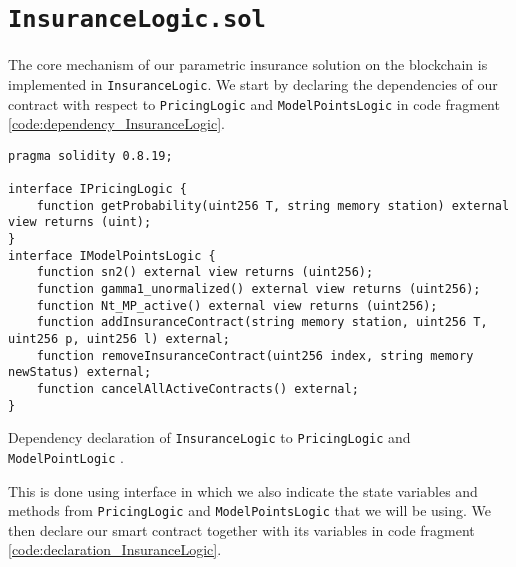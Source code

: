 \documentclass[10pt]{article}
\begin{document}
\section{\texttt{InsuranceLogic.sol}}\label{sec:InsuranceLogic_sol}
The core mechanism of our parametric insurance solution on the blockchain is implemented in \texttt{InsuranceLogic}. We start by declaring the dependencies of our contract with respect to \texttt{PricingLogic} and \texttt{ModelPointsLogic} in code fragment \ref{code:dependency_InsuranceLogic}.

\begin{codefragment}[!h]
\begin{lstlisting}[language=Solidity]
pragma solidity 0.8.19;

interface IPricingLogic {
    function getProbability(uint256 T, string memory station) external view returns (uint);
}
interface IModelPointsLogic {
    function sn2() external view returns (uint256);
    function gamma1_unormalized() external view returns (uint256);
    function Nt_MP_active() external view returns (uint256);
    function addInsuranceContract(string memory station, uint256 T, uint256 p, uint256 l) external;
    function removeInsuranceContract(uint256 index, string memory newStatus) external;
    function cancelAllActiveContracts() external;
}
\end{lstlisting}
    \caption{Dependency declaration of \texttt{InsuranceLogic} to \texttt{PricingLogic} and \texttt{ModelPointLogic} .}
    \label{code:dependency_InsuranceLogic}
\end{codefragment}

This is done using interface in which we also indicate the state variables and methods from \texttt{PricingLogic} and \texttt{ModelPointsLogic} that we will be using. We then declare our smart contract together with its variables in code fragment \ref{code:declaration_InsuranceLogic}.
\end{document}
